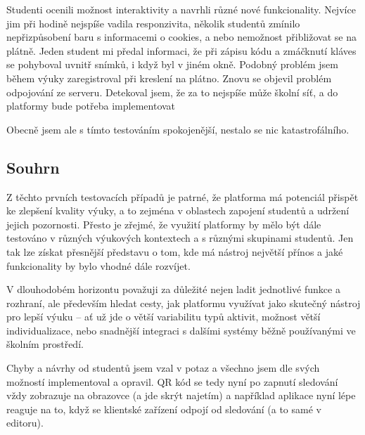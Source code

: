 Studenti ocenili možnost interaktivity a navrhli různé nové funkcionality.
Nejvíce jim při hodině nejspíše vadila responzivita, několik studentů zmínilo nepřizpůsobení baru s informacemi o cookies, a nebo nemožnost přibližovat se na plátně.
Jeden student mi předal informaci, že při zápisu kódu a zmáčknutí kláves se pohyboval uvnitř snímků, i když byl v jiném okně.
Podobný problém jsem během výuky zaregistroval při kreslení na plátno.
Znovu se objevil problém odpojování ze serveru.
Detekoval jsem, že za to nejspíše může školní síť, a do platformy bude potřeba implementovat 

Obecně jsem ale s tímto testováním spokojenější, nestalo se nic katastrofálního.

\subsection{Souhrn}

Z těchto prvních testovacích případů je patrné, že platforma má potenciál přispět ke zlepšení kvality výuky, a to zejména v oblastech zapojení studentů a udržení jejich pozornosti. 
Přesto je zřejmé, že využití platformy by mělo být dále testováno v různých výukových kontextech a s různými skupinami studentů. 
Jen tak lze získat přesnější představu o tom, kde má nástroj největší přínos a jaké funkcionality by bylo vhodné dále rozvíjet.

V dlouhodobém horizontu považuji za důležité nejen ladit jednotlivé funkce a rozhraní, ale především hledat cesty, jak platformu využívat jako skutečný nástroj pro lepší výuku -- ať už jde o větší variabilitu typů aktivit, možnost větší individualizace, nebo snadnější integraci s dalšími systémy běžně používanými ve školním prostředí.

Chyby a návrhy od studentů jsem vzal v potaz a všechno jsem dle svých možností implementoval a opravil.
QR kód se tedy nyní po zapnutí sledování vždy zobrazuje na obrazovce (a jde skrýt najetím) a například aplikace nyní lépe reaguje na to, když se klientské zařízení odpojí od sledování (a to samé v editoru).